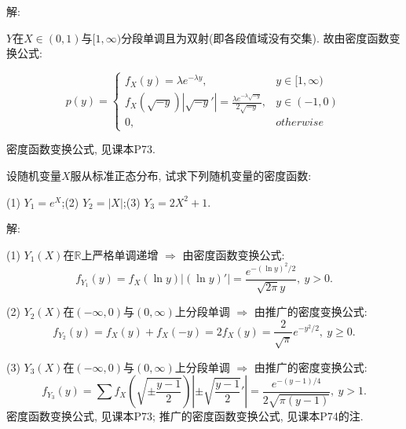 \documentclass[standard]{ExBook}
\begin{document}
\begin{qitems}
\vspace{-5em}

    \begin{bbox}
解: 

$Y$在$X\in(0,1)$与$[1,\infty)$分段单调且为双射(即各段值域没有交集). 故由密度函数变换公式:
\vspace{-2em}
\begin{center}
\begin{equation}
    p(y)=
    \left\{
    \begin{array}{cl}
        \nonumber
        f_{X}(y)=\lambda e^{-\lambda y}, &y\in[1,\infty)\\
        f_{X}(\sqrt{-y})|\sqrt{-y}'|=\displaystyle\frac{\lambda e^{-\lambda\sqrt{-y}}}{2\sqrt{-y}}, &y\in(-1,0)\\
        0, &otherwise
    \end{array}
    \right.
\end{equation}
\end{center}
\textcolor{themeColor}{\selectfont {} 密度函数变换公式, 见课本P73.}
    \end{bbox}

\vspace{-5em}

    \begin{bbox}
    \begin{shaded}
        \qitem
设随机变量$X$服从标准正态分布, 试求下列随机变量的密度函数:

(1) $Y_{1}=e^X$;\qquad(2) $Y_{2}=|X|$;\qquad(3) $Y_{3}=2X^2+1$.
    \end{shaded}
    \end{bbox}

\vspace{-5em}

    \begin{bbox}
解: 

(1) $Y_1(X)$在$\mathbb{R}$上严格单调递增 $\Longrightarrow$ 由密度函数变换公式:
$$f_{Y_1}(y)=f_{X}(\ln y)|(\ln y)'|=\displaystyle\frac{e^{-(\ln y)^2/2}}{\sqrt{2\pi}y},\ y>0.$$

(2) $Y_2(X)$在$(-\infty,0)$与$(0,\infty)$上分段单调 $\Longrightarrow$ 由推广的密度变换公式:
$$f_{Y_2}(y)=f_{X}(y)+f_{X}(-y)=2f_{X}(y)=\displaystyle\frac{2}{\sqrt{\pi}}e^{-y^2/2},\ y \geq 0.$$

(3) $Y_3(X)$在$(-\infty,0)$与$(0,\infty)$上分段单调 $\Longrightarrow$ 由推广的密度变换公式:
$$f_{Y_3}(y)=\sum f_{X}(\sqrt{\pm\displaystyle\frac{y-1}{2}})\left|\pm\sqrt{\displaystyle\frac{y-1}{2}}'\right|=\displaystyle\frac{e^{-(y-1)/4}}{2\sqrt{\pi(y-1)}},\ y > 1.$$
\textcolor{themeColor}{\selectfont {} 密度函数变换公式, 见课本P73; 推广的密度函数变换公式, 见课本P74的注.}
    \end{bbox}


\end{qitems}
\end{document}
